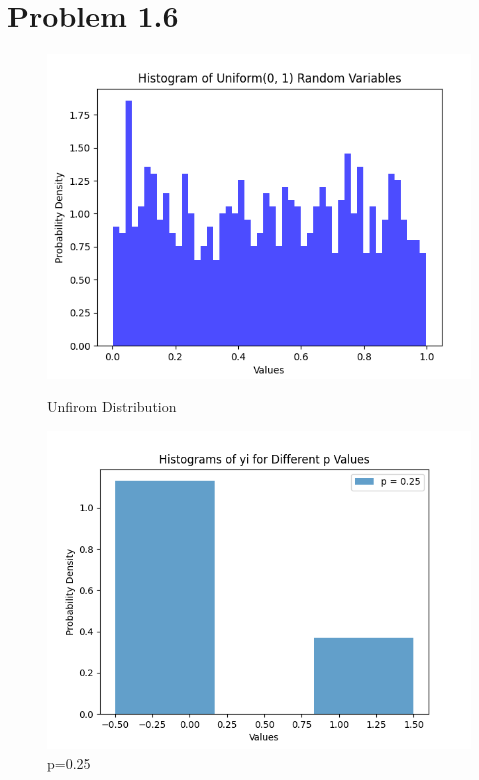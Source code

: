 \documentclass{article}
\begin{document}
\section*{Problem 1.6}
\begin{figure}
  \centering
  \begin{minipage}[b]{0.4\textwidth}
    \includegraphics[width=\textwidth]{assets/image.png}
    \caption{Unfirom Distribution}
  \end{minipage}
  \hfill
  \begin{minipage}[b]{0.4\textwidth}
    \includegraphics[width=\textwidth]{assets/pvalue1.png}
    \caption{p=0.25}
  \end{minipage}
\end{figure}
\end{document}
